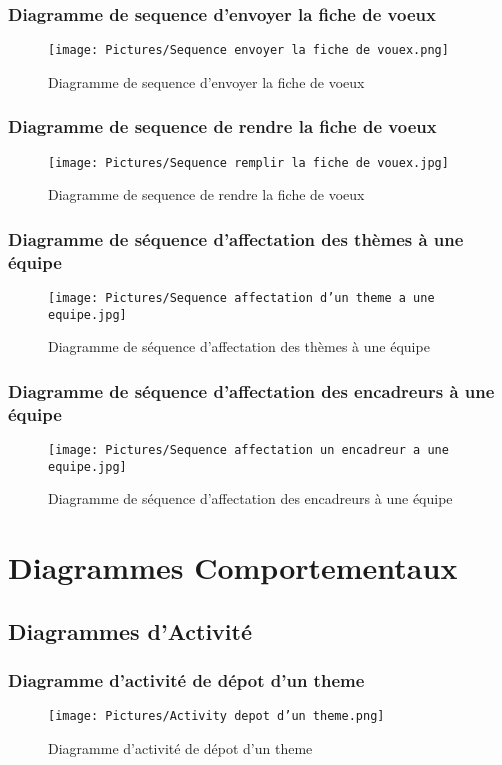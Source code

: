 \documentclass[11pt,fleqn]{book} %
\begin{document}
\subsubsection{Diagramme de sequence d'envoyer la fiche de voeux}
\begin{figure}[h]
    \centering
    \texttt{[image: Pictures/Sequence envoyer la fiche de vouex.png]}
    \caption{Diagramme de sequence d'envoyer la fiche de voeux}
    \label{fig:pca}
\end{figure}
\newpage
\subsubsection{Diagramme de sequence de rendre la fiche de voeux}
\begin{figure}[h]
    \centering
    \texttt{[image: Pictures/Sequence remplir la fiche de vouex.jpg]}
    \caption{Diagramme de sequence de rendre la fiche de voeux}
    \label{fig:pca}
\end{figure}
\newpage
\subsubsection{Diagramme de séquence d'affectation des thèmes à une équipe}
\begin{figure}[h]
    \centering
    \texttt{[image: Pictures/Sequence affectation d'un theme a une equipe.jpg]}
    \caption{Diagramme de séquence d'affectation des thèmes à une équipe}
    \label{fig:pca}
\end{figure}
\newpage
\subsubsection{Diagramme de séquence d'affectation des encadreurs à une équipe}
\begin{figure}[h]
    \centering
    \texttt{[image: Pictures/Sequence affectation un encadreur a une equipe.jpg]}
    \caption{Diagramme de séquence d'affectation des encadreurs à une équipe}
    \label{fig:pca}
\end{figure}
\newpage
\section{Diagrammes Comportementaux}
\subsection{Diagrammes d’Activité}
\subsubsection{Diagramme d'activité de dépot d'un theme}
\begin{figure}[h]
    \centering
    \texttt{[image: Pictures/Activity depot d'un theme.png]}
    \caption{Diagramme d'activité de dépot d'un theme}
    \label{fig:pca}
\end{figure}
\newpage
\end{document}
